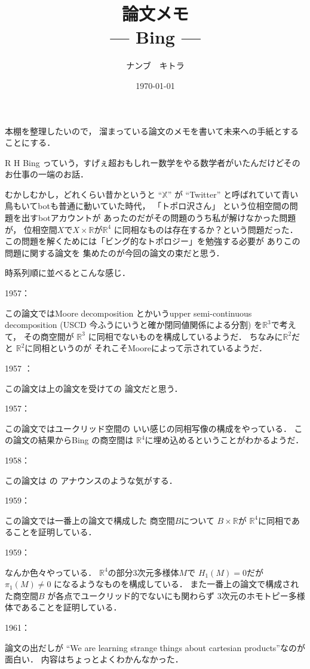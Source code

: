 \documentclass[leqno, a4paper, 12pt]{jsarticle}
\title{論文メモ
\large{\\--- Bing ---}
}
\author{ナンブ　キトラ}
\date{\today}
\newcommand{\rr}{\mathbb{R}}
\begin{document}
\maketitle

本棚を整理したいので，
溜まっている論文のメモを書いて未来への手紙とすることにする．

R H Bing っていう，すげぇ超おもしれー数学をやる数学者がいたんだけどそのお仕事の一端のお話．

むかしむかし，どれくらい昔かというと
``$\mathbb{X}$''
が
``Twitter''
と呼ばれていて青い鳥もいてbotも普通に動いていた時代，
「トポロ沢さん」
という位相空間の問題を出すbotアカウントが
あったのだがその問題のうち私が解けなかった問題が，
位相空間$X$で$X\times \rr$が$\rr^{4}$
に同相なものは存在するか？という問題だった．
この問題を解くためには「ビング的なトポロジー」を勉強する必要が
ありこの問題に関する論文を
集めたのが今回の論文の束だと思う．



時系列順に並べるとこんな感じ．

1957： \cite{MR0092961}

この論文ではMoore decomposition 
とかいうupper semi-continuous decomposition 
(USCD 今ふうにいうと確か閉同値関係による分割)
を$\rr^{3}$で考えて，
その商空間が
$\rr^{3}$
に同相でないものを構成しているようだ．
ちなみに$\rr^{2}$だと
$\rr^{2}$に同相というのが
それこそMooreによって示されているようだ．

1957 ：
\cite{MR0092963}

この論文は上の論文を受けての
論文だと思う．

1957：
\cite{MR0092962}

この論文ではユークリッド空間の
いい感じの同相写像の構成をやっている．
この論文の結果からBing の商空間は
$\rr^{4}$に埋め込めるということがわかるようだ．

1958：\cite{MR0097034}

この論文は
\cite{MR0107228}の
アナウンスのような気がする．

1959：
\cite{MR0107228}

この論文では一番上の論文で構成した
商空間$B$について
$B\times \rr$が
$\rr^{4}$に同相であることを証明している．

1959：
\cite{MR0102817}

なんか色々やっている．
$\rr^{4}$の部分3次元多様体$M$で
$H_{1}(M)=0$だが
$\pi_{1}(M)\neq 0$
になるようなものを構成している．
また一番上の論文で構成された商空間$B$
が各点でユークリッド的でないにも関わらず
$3$次元のホモトピー多様体であることを証明している．

1961：
\cite{MR0123303}

論文の出だしが
``We are learning strange things about cartesian products''なのが面白い．
内容はちょっとよくわかんなかった．

\nocite{*}


\end{document}
